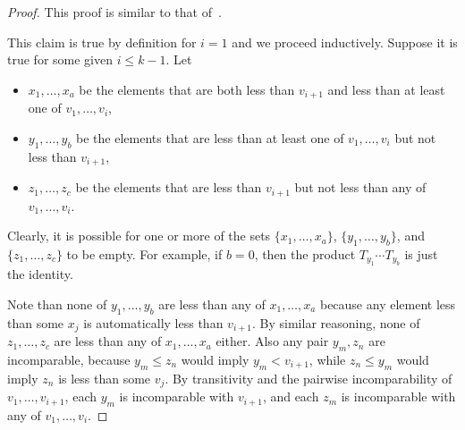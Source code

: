 \begin{proof}
This proof is similar to that of~\cite[Lemma 2.21]{antichain-toggling}.

This claim is true by definition for $i=1$ and we proceed inductively. Suppose it is true for some given $i\leq k-1$. Let
\begin{itemize}
\item $x_1,\dots,x_a$ be the elements that are both less than $v_{i+1}$ and less than at least one of $v_1,\dots,v_i$,
\item $y_1,\dots,y_b$ be the elements that are less than at least one of $v_1,\dots,v_i$ but not less than $v_{i+1}$,
\item $z_1,\dots,z_c$ be the elements that are less than $v_{i+1}$ but not less than any of $v_1,\dots,v_i$.
\end{itemize}
Clearly, it is possible for one or more of the sets $\{x_1,\dots,x_a\}$, $\{y_1,\dots,y_b\}$, and $\{z_1,\dots,z_c\}$ to be empty. For example, if $b=0$, then the product $T_{y_1}\cdots T_{y_b}$ is just the identity.

Note than none of $y_1,\dots,y_b$ are less than any of $x_1,\dots,x_a$ because any element less than some $x_j$ is automatically less than $v_{i+1}$. By similar reasoning, none of $z_1,\dots,z_c$ are less than any of $x_1,\dots,x_a$ either.
Also any pair $y_m,z_n$ are incomparable, because $y_m \leq z_n$ would imply $y_m<v_{i+1}$, while $z_n \leq y_m$ would imply $z_n$ is less than some $v_j$.
By transitivity and the pairwise incomparability of $v_1,\dots,v_{i+1}$, each $y_m$ is incomparable with $v_{i+1}$, and each $z_m$ is incomparable with any of $v_1,\dots,v_i$.


\end{proof}
